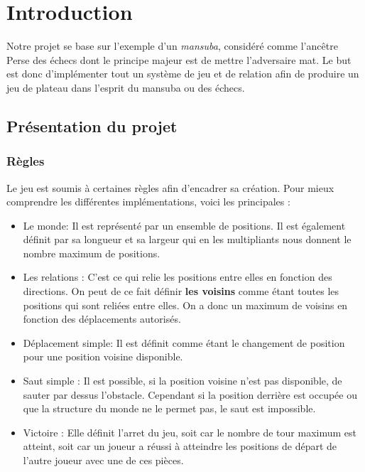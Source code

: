 \chapter{Introduction}
Notre projet se base sur l'exemple d'un \textit{mansuba}, considéré comme l'ancêtre Perse des échecs dont le principe majeur est de mettre l'adversaire mat. Le but est donc d'implémenter tout un système de jeu et de relation afin de produire un jeu de plateau dans l'esprit du mansuba ou des échecs.


\section{Présentation du projet}
    \subsection{Règles}
        Le jeu est soumis à certaines règles afin d'encadrer sa création. Pour mieux comprendre les différentes implémentations, voici les principales :
        \medbreak
        \begin{itemize}
            \item[\textdagger] Le monde: Il est représenté par un ensemble de positions. Il est également définit par sa longueur et sa largeur qui en les multipliants nous donnent le nombre maximum de positions.
            \medbreak
            \item[\textdagger] Les relations : C'est ce qui relie les positions entre elles en fonction des directions. On peut de ce fait définir \textbf{les voisins} comme étant toutes les positions qui sont reliées entre elles. On a donc un maximum de voisins en fonction des déplacements autorisés.
            \medbreak
            \item[\textdagger] Déplacement simple: Il est définit comme étant le changement de position pour une position voisine disponible.
            \medbreak
            \item[\textdagger] Saut simple : Il est possible, si la position voisine n'est pas disponible, de sauter par dessus l'obstacle. Cependant si la position derrière est occupée ou que la structure du monde ne le permet pas, le saut est impossible.
            \medbreak
            \item[\textdagger] Victoire : Elle définit l'arret du jeu, soit car le nombre de tour maximum est atteint, soit car un joueur a réussi à atteindre les positions de départ de l'autre joueur avec une de ces pièces.
        \end{itemize}
        
